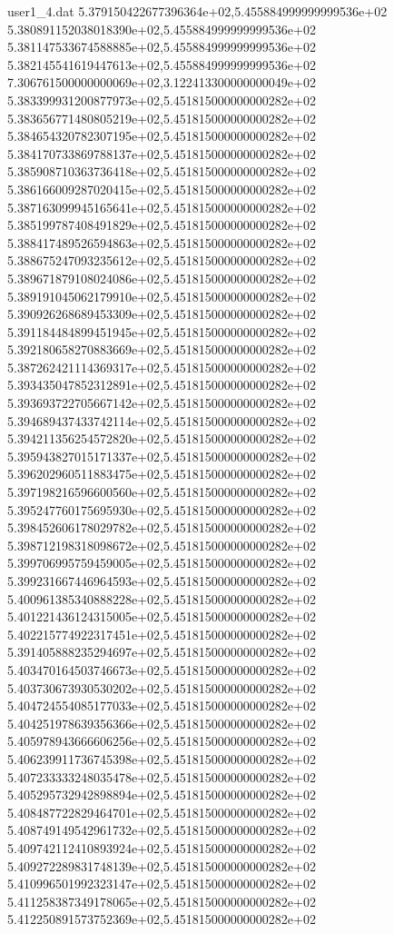 \begin{filecontents}{user1_4.dat}
5.379150422677396364e+02,5.455884999999999536e+02
5.380891152038018390e+02,5.455884999999999536e+02
5.381147533674588885e+02,5.455884999999999536e+02
5.382145541619447613e+02,5.455884999999999536e+02
7.306761500000000069e+02,3.122413300000000049e+02
5.383399931200877973e+02,5.451815000000000282e+02
5.383656771480805219e+02,5.451815000000000282e+02
5.384654320782307195e+02,5.451815000000000282e+02
5.384170733869788137e+02,5.451815000000000282e+02
5.385908710363736418e+02,5.451815000000000282e+02
5.386166009287020415e+02,5.451815000000000282e+02
5.387163099945165641e+02,5.451815000000000282e+02
5.385199787408491829e+02,5.451815000000000282e+02
5.388417489526594863e+02,5.451815000000000282e+02
5.388675247093235612e+02,5.451815000000000282e+02
5.389671879108024086e+02,5.451815000000000282e+02
5.389191045062179910e+02,5.451815000000000282e+02
5.390926268689453309e+02,5.451815000000000282e+02
5.391184484899451945e+02,5.451815000000000282e+02
5.392180658270883669e+02,5.451815000000000282e+02
5.387262421114369317e+02,5.451815000000000282e+02
5.393435047852312891e+02,5.451815000000000282e+02
5.393693722705667142e+02,5.451815000000000282e+02
5.394689437433742114e+02,5.451815000000000282e+02
5.394211356254572820e+02,5.451815000000000282e+02
5.395943827015171337e+02,5.451815000000000282e+02
5.396202960511883475e+02,5.451815000000000282e+02
5.397198216596600560e+02,5.451815000000000282e+02
5.395247760175695930e+02,5.451815000000000282e+02
5.398452606178029782e+02,5.451815000000000282e+02
5.398712198318098672e+02,5.451815000000000282e+02
5.399706995759459005e+02,5.451815000000000282e+02
5.399231667446964593e+02,5.451815000000000282e+02
5.400961385340888228e+02,5.451815000000000282e+02
5.401221436124315005e+02,5.451815000000000282e+02
5.402215774922317451e+02,5.451815000000000282e+02
5.391405888235294697e+02,5.451815000000000282e+02
5.403470164503746673e+02,5.451815000000000282e+02
5.403730673930530202e+02,5.451815000000000282e+02
5.404724554085177033e+02,5.451815000000000282e+02
5.404251978639356366e+02,5.451815000000000282e+02
5.405978943666606256e+02,5.451815000000000282e+02
5.406239911736745398e+02,5.451815000000000282e+02
5.407233333248035478e+02,5.451815000000000282e+02
5.405295732942898894e+02,5.451815000000000282e+02
5.408487722829464701e+02,5.451815000000000282e+02
5.408749149542961732e+02,5.451815000000000282e+02
5.409742112410893924e+02,5.451815000000000282e+02
5.409272289831748139e+02,5.451815000000000282e+02
5.410996501992323147e+02,5.451815000000000282e+02
5.411258387349178065e+02,5.451815000000000282e+02
5.412250891573752369e+02,5.451815000000000282e+02

\end{filecontents}
